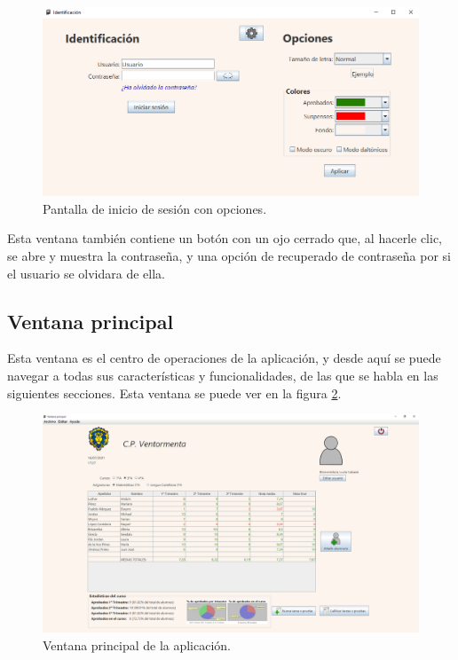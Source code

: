 \begin{figure}[h]
\centering\includegraphics[width=1\linewidth]{figs/loginopciones.png}
\caption{Pantalla de inicio de sesión con opciones.}
\label{Fig:loginopciones}
\end{figure}

Esta ventana también contiene un botón con un ojo cerrado que, al hacerle clic, se abre y muestra la contraseña, y una opción de recuperado de contraseña por si el usuario se olvidara de ella.


\subsection{Ventana principal}
Esta ventana es el centro de operaciones de la aplicación, y desde aquí se puede navegar a todas sus características y funcionalidades, de las que se habla en las siguientes secciones. Esta ventana se puede ver en la figura \ref{Fig:ventanaprincipal}.

\begin{figure}[h]
\centering\includegraphics[width=1\linewidth]{figs/ventanaprincipal.png}
\caption{Ventana principal de la aplicación.}
\label{Fig:ventanaprincipal}
\end{figure}

